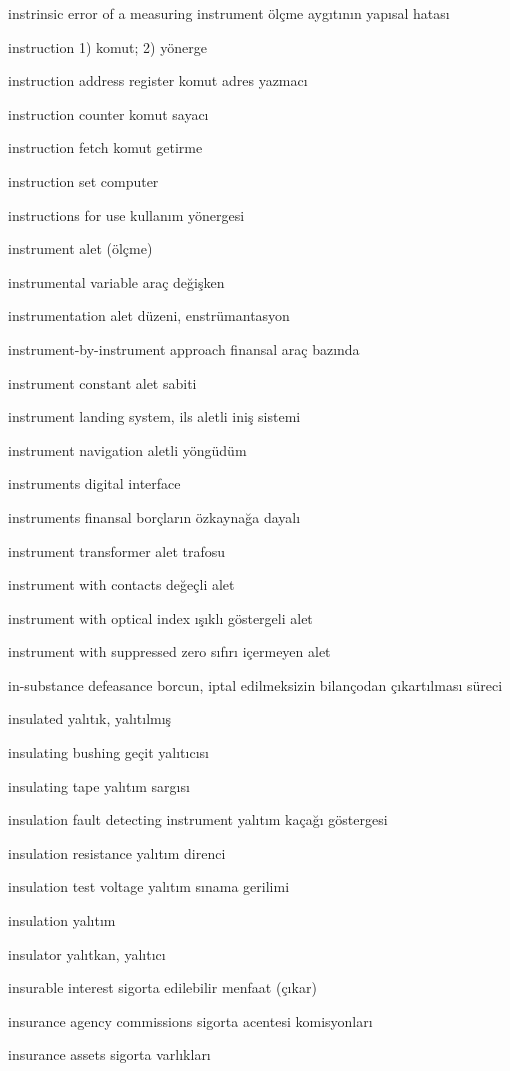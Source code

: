 \documentclass[12pt,fleqn]{article}\usepackage{../../common}
\begin{document}
instrinsic error of a measuring instrument ölçme aygıtının yapısal hatası

instruction 1) komut; 2) yönerge

instruction address register komut adres yazmacı

instruction counter komut sayacı

instruction fetch komut getirme

instruction set computer

instructions for use kullanım yönergesi

instrument alet (ölçme)

instrumental variable araç değişken

instrumentation alet düzeni, enstrümantasyon

instrument-by-instrument approach finansal araç bazında

instrument constant alet sabiti

instrument landing system, ils aletli iniş sistemi

instrument navigation aletli yöngüdüm

instruments digital interface

instruments finansal borçların özkaynağa dayalı

instrument transformer alet trafosu

instrument with contacts değeçli alet

instrument with optical index ışıklı göstergeli alet

instrument with suppressed zero sıfırı içermeyen alet

in-substance defeasance borcun, iptal edilmeksizin bilançodan çıkartılması süreci

insulated yalıtık, yalıtılmış

insulating bushing geçit yalıtıcısı

insulating tape yalıtım sargısı

insulation fault detecting instrument yalıtım kaçağı göstergesi

insulation resistance yalıtım direnci

insulation test voltage yalıtım sınama gerilimi

insulation yalıtım

insulator yalıtkan, yalıtıcı

insurable interest sigorta edilebilir menfaat (çıkar)

insurance agency commissions sigorta acentesi komisyonları

insurance assets sigorta varlıkları
\end{document}
